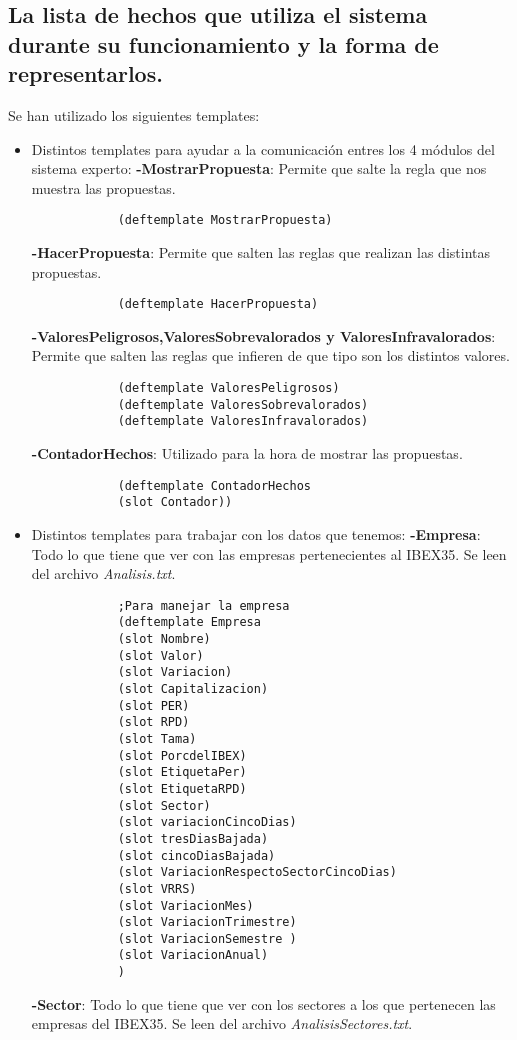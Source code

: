 \subsection{ La lista de hechos que utiliza el sistema durante su funcionamiento y la forma de representarlos.}
Se han utilizado los siguientes templates:
\begin{itemize}
	\item Distintos templates para ayudar a la comunicación entres los 4 módulos del sistema experto:
	\subitem \textbf{-MostrarPropuesta}: Permite que salte la regla que nos muestra las propuestas.
			\begin{verbatim}
			(deftemplate MostrarPropuesta)
			\end{verbatim}
	\subitem \textbf{-HacerPropuesta}: Permite que salten las reglas que realizan las distintas propuestas.
			\begin{verbatim}
			(deftemplate HacerPropuesta)
			\end{verbatim}
	\subitem \textbf{-ValoresPeligrosos,ValoresSobrevalorados y ValoresInfravalorados}: Permite que salten las reglas que infieren de que tipo son los distintos valores.
			\begin{verbatim}
			(deftemplate ValoresPeligrosos)
			(deftemplate ValoresSobrevalorados)
			(deftemplate ValoresInfravalorados)
			\end{verbatim}
	\subitem \textbf{-ContadorHechos}: Utilizado para la hora de mostrar las propuestas.
			\begin{verbatim}
			(deftemplate ContadorHechos
			(slot Contador))
			\end{verbatim}
	\item Distintos templates para trabajar con los datos que tenemos:
	\subitem \textbf{-Empresa}: Todo lo que tiene que ver con las empresas pertenecientes al IBEX35. Se leen del archivo \textit{Analisis.txt}.
			\begin{verbatim}
			;Para manejar la empresa
			(deftemplate Empresa
			(slot Nombre)
			(slot Valor)
			(slot Variacion)
			(slot Capitalizacion)
			(slot PER)
			(slot RPD)
			(slot Tama)
			(slot PorcdelIBEX)
			(slot EtiquetaPer)
			(slot EtiquetaRPD)
			(slot Sector)
			(slot variacionCincoDias)
			(slot tresDiasBajada)
			(slot cincoDiasBajada)
			(slot VariacionRespectoSectorCincoDias)
			(slot VRRS)
			(slot VariacionMes)
			(slot VariacionTrimestre)
			(slot VariacionSemestre )
			(slot VariacionAnual)
			)
			\end{verbatim}
	\subitem \textbf{-Sector}: Todo lo que tiene que ver con los sectores a los que pertenecen las empresas del IBEX35. Se leen del archivo \textit{AnalisisSectores.txt}.

\end{itemize}
